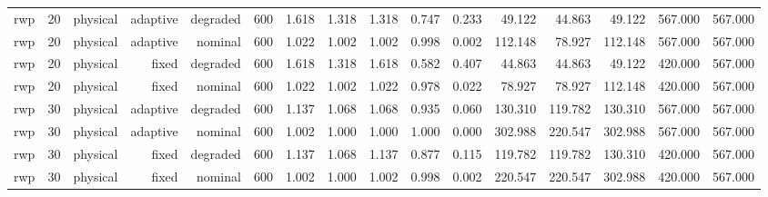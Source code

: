 \begin{tabular}{lrrrrrrrrrrrrrrr}
rwp & 20 & physical & adaptive & degraded & 600 & 1.618 & 1.318 & 1.318 & 0.747 & 0.233 & 49.122 & 44.863 & 49.122 & 567.000 & 567.000 \\
rwp & 20 & physical & adaptive & nominal & 600 & 1.022 & 1.002 & 1.002 & 0.998 & 0.002 & 112.148 & 78.927 & 112.148 & 567.000 & 567.000 \\
rwp & 20 & physical & fixed & degraded & 600 & 1.618 & 1.318 & 1.618 & 0.582 & 0.407 & 44.863 & 44.863 & 49.122 & 420.000 & 567.000 \\
rwp & 20 & physical & fixed & nominal & 600 & 1.022 & 1.002 & 1.022 & 0.978 & 0.022 & 78.927 & 78.927 & 112.148 & 420.000 & 567.000 \\
rwp & 30 & physical & adaptive & degraded & 600 & 1.137 & 1.068 & 1.068 & 0.935 & 0.060 & 130.310 & 119.782 & 130.310 & 567.000 & 567.000 \\
rwp & 30 & physical & adaptive & nominal & 600 & 1.002 & 1.000 & 1.000 & 1.000 & 0.000 & 302.988 & 220.547 & 302.988 & 567.000 & 567.000 \\
rwp & 30 & physical & fixed & degraded & 600 & 1.137 & 1.068 & 1.137 & 0.877 & 0.115 & 119.782 & 119.782 & 130.310 & 420.000 & 567.000 \\
rwp & 30 & physical & fixed & nominal & 600 & 1.002 & 1.000 & 1.002 & 0.998 & 0.002 & 220.547 & 220.547 & 302.988 & 420.000 & 567.000 \\
\bottomrule
\end{tabular}